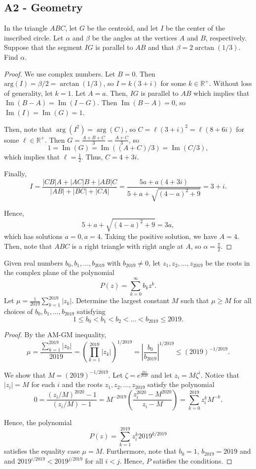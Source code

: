 \documentclass[11pt]{scrartcl}
\newcommand{\R}{\mathbb{R}}
\renewcommand{\Im}{\operatorname{Im}}
\begin{document}
\subsection{A2 - Geometry}
\begin{Prob}[2019 - A2] In the triangle $ABC$, let $G$ be the centroid, and let $I$
be the center of the inscribed circle. Let $\alpha$ and $\beta$ be
the angles at the vertices $A$ and $B$, respectively. Suppose that the segment $IG$ is parallel to $AB$ and that
$\beta = 2\arctan(1/3)$. Find $\alpha$.
\end{Prob}
\begin{proof}
We use complex numbers.  Let $B = 0$.  Then $\text{arg}(I) = \beta/2 = \arctan(1/3)$, so $I = k(3+i)$ for some $k \in \R^+$.  Without loss of generality, let $k = 1$.  Let $A = a$.  Then, $IG$ is parallel to $AB$ which implies that $\operatorname{Im}(B-A) = \Im(I-G)$.  Then $\Im(B-A) = 0$, so $\Im(I) = \Im(G) = 1$.  

Then, note that $\arg(I^2) = \arg(C)$, so $C = \ell(3+i)^2 = \ell(8+6i)$ for some $\ell \in \R^+$.  Then $G = \frac{A+B+C}{3} = \frac{A+C}{3}$, so $$1 = \Im(G) = \Im((A+C)/3) = \Im(C/3),$$ which implies that $\ell = \frac{1}{2}$.  Thus, $C = 4+3i$.  

Finally, $$I = \frac{|CB|A + |AC|B + |AB|C}{|AB|+|BC|+|CA|} = \frac{5a + a(4+3i)}{5+a+\sqrt{(4-a)^2+9}} = 3+i.$$

Hence,
$$5+a+\sqrt{(4-a)^2+9} = 3a,$$
which has solutions $a = 0, a = 4$.  Taking the positive solution, we have $A = 4$.  Then, note that $ABC$ is a right triangle with right angle at $A$, so $\alpha = \frac{\pi}{2}$.
\end{proof}

\begin{Prob}[2019 - A3] Given real numbers $b_0, b_1, \dots, b_{2019}$ with $b_{2019} \ne 0$, let $z_1, z_2, \dots, z_{2019}$ be the roots in the complex plane of the polynomial $$P(z) = \sum_{k=0}^\infty b_kz^k.$$
Let $\mu = \frac{1}{2019}\sum_{k=1}^{2019}|z_k|$.  Determine the largest constant $M$ such that $\mu \ge M$ for all choices of $b_0, b_1, \dots, b_{2019}$ satisfying 
$$1 \le b_0 < b_1 < b_2 < \dots < b_{2019} \le 2019.$$
\end{Prob}
\begin{proof}
By the AM-GM inequality,
$$\mu = \frac{\sum_{k=1}^{2019}|z_k|}{2019} = \left (\prod_{k=1}^{2019} |z_k|\right )^{1/2019} = \left |\frac{b_0}{b_{2019}} \right|^{1/2019} \le (2019)^{-1/2019}.$$

We show that $M = (2019)^{-1/2019}$.  Let $\zeta = e^{\frac{2\pi i}{2020}}$ and let $z_i = M\zeta^i$. Notice that $|z_i| = M$ for each $i$ and the roots $z_1, z_2, \dots, z_{2019}$ satisfy the polynomial
$$0 = \frac{(z_i/M)^{2020} - 1}{(z_i/M) - 1} = M^{-2019}\left (\frac{z_i^{2020} - M^{2020}}{z_i - M}\right ) =\sum_{k=0}^{2019}z_i^{k}M^{-k}.$$

Hence, the polynomial $$P(z) = \sum_{k=1}^{2019}z_i^k2019^{k/2019}$$
satisfies the equality case $\mu = M$.  Furthermore, note that 
$b_0 = 1$, $b_{2019} = 2019$ and and $2019^{i/2019} < 2019^{j/2019}$ for all $i < j$.  Hence, $P$ satisfies the conditions.
\end{proof}
\end{document}

